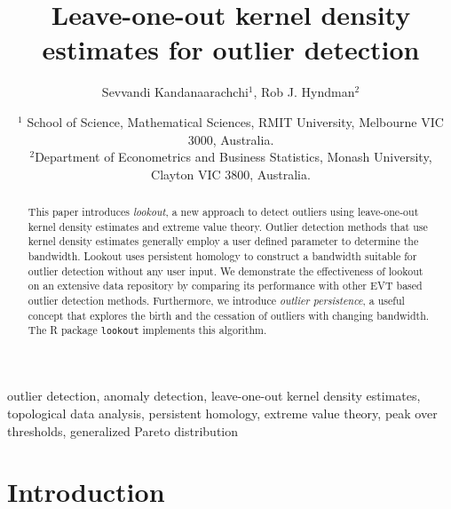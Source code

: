 \documentclass[letter,12pt]{article}
\begin{document}


\title{Leave-one-out kernel density estimates for outlier detection}
\author{Sevvandi Kandanaarachchi$^1$, Rob J. Hyndman$^2$}
\date{%
   \scriptsize{ $^1$ School of Science,  Mathematical Sciences, RMIT University, Melbourne VIC 3000, Australia.\\ 
   $^2$Department of Econometrics and Business Statistics, Monash University, Clayton VIC 3800, Australia.\\ [2ex]}%
    }
\begin{titlingpage}
\maketitle
\begin{abstract}
This paper introduces \textit{lookout}, a new approach to detect outliers using leave-one-out kernel density estimates and extreme value theory. Outlier detection methods that use  kernel density estimates generally employ a user defined parameter to determine the bandwidth. Lookout uses persistent homology to construct a bandwidth suitable for outlier detection without any user input.  We demonstrate the effectiveness of lookout on an extensive data repository by comparing its performance  with other EVT based outlier detection methods. Furthermore, we introduce \textit{outlier persistence}, a useful concept that explores the birth and the cessation of outliers with changing bandwidth. The R package \texttt{lookout} implements this algorithm. 
\end{abstract}

\begin{keywords}outlier detection, anomaly detection, leave-one-out kernel density estimates, topological data analysis, persistent homology, extreme value theory, peak over thresholds, generalized Pareto distribution
\end{keywords}

\end{titlingpage}

\section{Introduction}\label{sec:introduction}
\end{document}
